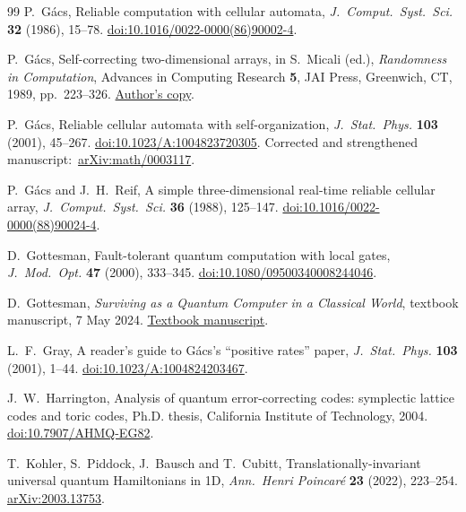 \begin{thebibliography}{99}
P.~G\'acs,
Reliable computation with cellular automata,
\emph{J.~Comput.~Syst.~Sci.} \textbf{32} (1986), 15--78.
\href{https://doi.org/10.1016/0022-0000(86)90002-4}{doi:10.1016/0022-0000(86)90002-4}.

P.~G\'acs,
Self-correcting two-dimensional arrays,
in S.~Micali (ed.), \emph{Randomness in Computation},
Advances in Computing Research \textbf{5},
JAI Press, Greenwich, CT, 1989, pp.~223--326.
\href{https://cs-web.bu.edu/faculty/gacs/papers/self-correcting-2d.pdf}{Author's copy}.

P.~G\'acs,
Reliable cellular automata with self-organization,
\emph{J.~Stat.~Phys.} \textbf{103} (2001), 45--267.
\href{https://doi.org/10.1023/A:1004823720305}{doi:10.1023/A:1004823720305}.
Corrected and strengthened manuscript:~\href{https://arxiv.org/abs/math/0003117}{arXiv:math/0003117}.

P.~G\'acs and J.~H.~Reif,
A simple three-dimensional real-time reliable cellular array,
\emph{J.~Comput.~Syst.~Sci.} \textbf{36} (1988), 125--147.
\href{https://doi.org/10.1016/0022-0000(88)90024-4}{doi:10.1016/0022-0000(88)90024-4}.

D.~Gottesman,
Fault-tolerant quantum computation with local gates,
\emph{J.~Mod.~Opt.} \textbf{47} (2000), 333--345.
\href{https://doi.org/10.1080/09500340008244046}{doi:10.1080/09500340008244046}.

D.~Gottesman,
\emph{Surviving as a Quantum Computer in a Classical World},
textbook manuscript, 7 May 2024.
\href{https://www.cs.umd.edu/~dgottesm/QECCbook-2024.pdf}{Textbook manuscript}.

L.~F.~Gray,
A reader's guide to G\'acs's ``positive rates'' paper,
\emph{J.~Stat.~Phys.} \textbf{103} (2001), 1--44.
\href{https://doi.org/10.1023/A:1004824203467}{doi:10.1023/A:1004824203467}.

J.~W.~Harrington,
Analysis of quantum error-correcting codes: symplectic lattice codes and toric codes,
Ph.D. thesis, California Institute of Technology, 2004.
\href{https://doi.org/10.7907/AHMQ-EG82}{doi:10.7907/AHMQ-EG82}.

T.~Kohler, S.~Piddock, J.~Bausch and T.~Cubitt,
Translationally-invariant universal quantum Hamiltonians in 1D,
\emph{Ann.~Henri Poincar\'e} \textbf{23} (2022), 223--254.
\href{https://arxiv.org/abs/2003.13753}{arXiv:2003.13753}.


\end{thebibliography}
